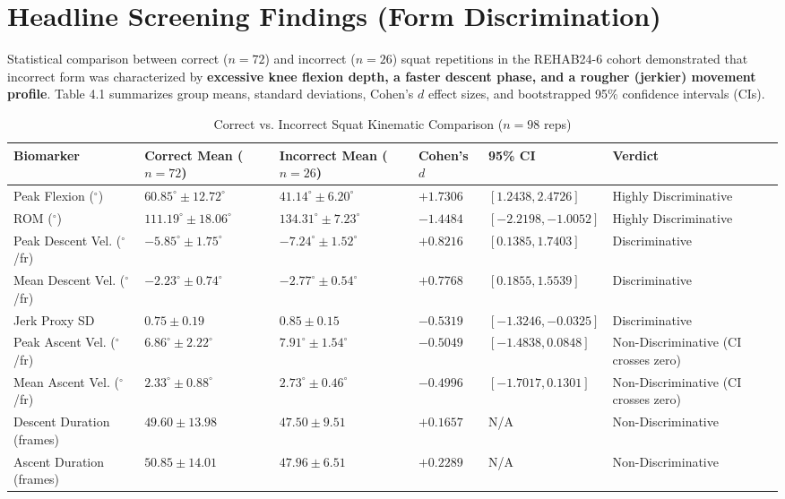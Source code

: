 \section{Headline Screening Findings (Form Discrimination)}
\label{sec:4-2-headline-screening-findings-form-discrimination}


Statistical comparison between correct ($n = 72$) and incorrect ($n = 26$) squat repetitions in the REHAB24-6 cohort demonstrated that incorrect form was characterized by \textbf{excessive knee flexion depth, a faster descent phase, and a rougher (jerkier) movement profile}. Table 4.1 summarizes group means, standard deviations, Cohen's $d$ effect sizes, and bootstrapped 95\% confidence intervals (CIs).


\begin{table}[htbp]
\centering
\scriptsize
\setlength{\tabcolsep}{3pt}
\renewcommand{\arraystretch}{1.2}
\caption{Correct vs. Incorrect Squat Kinematic Comparison ($n = 98$ reps)}
\label{tab:table-4-1-correct-vs-incorrect-squat-kinematic-comparison-reps}
\begin{tabular}{@{}p{3.1cm} >{\centering\arraybackslash}p{2.2cm} >{\centering\arraybackslash}p{2.2cm} >{\centering\arraybackslash}p{1.0cm} >{\centering\arraybackslash}p{2.3cm} p{3.4cm}@{}}
\hline
\textbf{Biomarker} & \textbf{Correct Mean} ($n=72$) & \textbf{Incorrect Mean} ($n=26$) & \textbf{Cohen's $d$} & \textbf{95\% CI} & \textbf{Verdict} \\
\hline
Peak Flexion ($^\circ$) & $60.85^\circ \pm 12.72^\circ$ & $41.14^\circ \pm 6.20^\circ$ & $+1.7306$ & $[1.2438, 2.4726]$ & Highly Discriminative \\
ROM ($^\circ$) & $111.19^\circ \pm 18.06^\circ$ & $134.31^\circ \pm 7.23^\circ$ & $-1.4484$ & $[-2.2198, -1.0052]$ & Highly Discriminative \\
Peak Descent Vel. ($^\circ$/fr) & $-5.85^\circ \pm 1.75^\circ$ & $-7.24^\circ \pm 1.52^\circ$ & $+0.8216$ & $[0.1385, 1.7403]$ & Discriminative \\
Mean Descent Vel. ($^\circ$/fr) & $-2.23^\circ \pm 0.74^\circ$ & $-2.77^\circ \pm 0.54^\circ$ & $+0.7768$ & $[0.1855, 1.5539]$ & Discriminative \\
Jerk Proxy SD & $0.75 \pm 0.19$ & $0.85 \pm 0.15$ & $-0.5319$ & $[-1.3246, -0.0325]$ & Discriminative \\
Peak Ascent Vel. ($^\circ$/fr) & $6.86^\circ \pm 2.22^\circ$ & $7.91^\circ \pm 1.54^\circ$ & $-0.5049$ & $[-1.4838, 0.0848]$ & Non-Discriminative (CI crosses zero) \\
Mean Ascent Vel. ($^\circ$/fr) & $2.33^\circ \pm 0.88^\circ$ & $2.73^\circ \pm 0.46^\circ$ & $-0.4996$ & $[-1.7017, 0.1301]$ & Non-Discriminative (CI crosses zero) \\
Descent Duration (frames) & $49.60 \pm 13.98$ & $47.50 \pm 9.51$ & $+0.1657$ & N/A & Non-Discriminative \\
Ascent Duration (frames) & $50.85 \pm 14.01$ & $47.96 \pm 6.51$ & $+0.2289$ & N/A & Non-Discriminative \\
\hline
\end{tabular}
\end{table}

